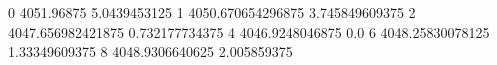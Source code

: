 0 4051.96875 5.0439453125
1 4050.670654296875 3.745849609375
2 4047.656982421875 0.732177734375
4 4046.9248046875 0.0
6 4048.25830078125 1.33349609375
8 4048.9306640625 2.005859375
